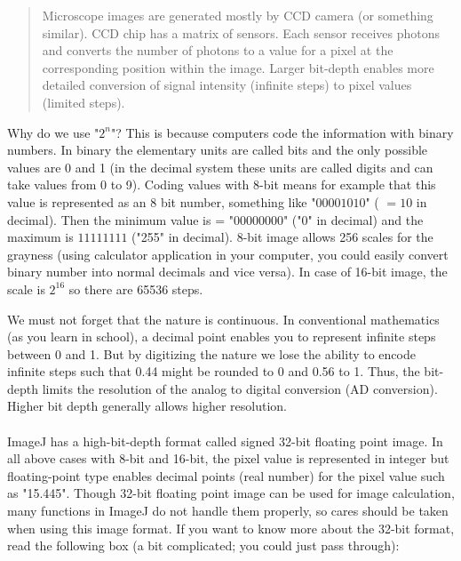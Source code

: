 \begin{quote}
Microscope images are generated
mostly by CCD camera (or something similar). 
CCD chip has a matrix of sensors. Each sensor receives
photons and converts the number of photons to a value for a
pixel at the corresponding position within the image. Larger bit-depth
enables more detailed conversion of signal intensity (infinite steps) to pixel values (limited steps).
\end{quote}
Why do we use "$2^{n}$"? This
is because computers code the information with binary numbers. In binary the elementary units are called bits and the only possible values are 0 and 1 (in the decimal system these units are called digits and can take values from 0 to 9).
Coding values with 8-bit means for example that this value is represented as an 8 bit number, something like "$00001010$" ( $= 10$ in
decimal). Then the minimum value is =
"$00000000$" ("0" in decimal) and the maximum is $11111111$
("255" in decimal). 8-bit image allows 256
scales for the grayness (using calculator application in your computer,
you could easily convert binary number into normal decimals and vice
versa). In case of 16-bit image, the scale is $2^{16}$ so
there are 65536 steps. 


We must not forget that the nature is continuous. In conventional
mathematics (as you learn in school), a decimal point enables you to represent
infinite steps between 0 and 1. But by digitizing the nature we lose
the ability to encode infinite steps such that 0.44 might be rounded to 0 and 0.56 to
1. Thus, the bit-depth limits the resolution of the analog to digital
conversion (AD conversion). Higher bit depth generally allows higher
resolution.\\
\\
ImageJ has a high-bit-depth format called signed 32-bit floating point
image. In all above cases with 8-bit and 16-bit, the pixel value is
represented in integer but floating-point type enables decimal points
(real number) for the pixel value such as
"15.445". Though 32-bit floating point
image can be used for image calculation, many functions in ImageJ do
not handle them properly, so cares should be taken when using this image format. If
you want to know more about the 32-bit format, read the following box
(a bit complicated; you could just pass through):

